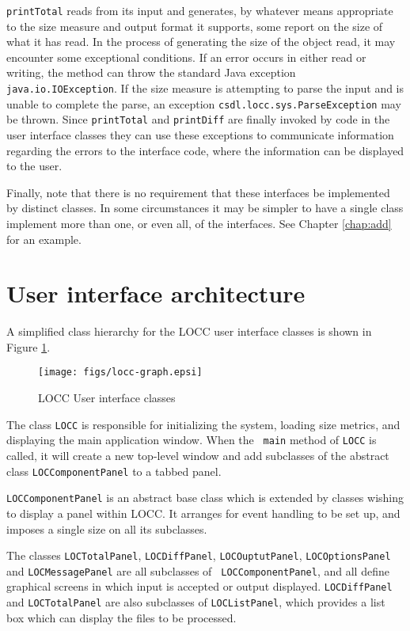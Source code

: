 \mbox{\tt printTotal} reads from its input and generates, by whatever means 
appropriate to the size measure and output format it supports, some
report on the size of what it has read.  In the process of generating
the size of the object read, it may encounter some exceptional
conditions.  If an error occurs in either read or writing, the method
can throw the standard Java exception \mbox{\tt java.io.IOException}.  If the
size measure is attempting to parse the input and is unable to
complete the parse, an exception \mbox{\tt csdl.locc.sys.ParseException} may be
thrown.  Since \mbox{\tt printTotal} and \mbox{\tt printDiff} are finally invoked by code in 
the user interface classes they can use these exceptions to
communicate information regarding the errors to the interface code,
where the information can be displayed to the user.  


Finally, note that there is no requirement that these interfaces be
implemented by distinct classes.  In some circumstances it may be
simpler to have a single class implement more than one, or even all,
of the interfaces.  See Chapter \ref{chap:add} for an example.


\section{User interface architecture}

A simplified class hierarchy for the LOCC user interface classes is shown
in Figure \ref{fig:user-graph}.

\begin{figure}
\centering
\texttt{[image: figs/locc-graph.epsi]}
\caption{LOCC User interface classes}
\label{fig:user-graph}
\end{figure}

The class {\tt LOCC} is responsible for initializing the system, loading
size metrics, and displaying the main application window.  When the {\tt
  main} method of {\tt LOCC} is called, it will create a new top-level
window and add subclasses of the abstract class {\tt LOCComponentPanel} to
a tabbed panel.  

{\tt LOCComponentPanel} is an abstract base class which is extended by
classes wishing to display a panel within LOCC.  It arranges for event
handling to be set up, and imposes a single size on all its subclasses.

The classes {\tt LOCTotalPanel}, {\tt LOCDiffPanel}, {\tt LOCOuptutPanel},
{\tt LOCOptionsPanel} and {\tt LOCMessagePanel} are all subclasses of {\tt
  LOCComponentPanel}, and all define graphical screens in which input is
accepted  or output displayed.  {\tt LOCDiffPanel} and {\tt LOCTotalPanel}
are also subclasses of {\tt LOCListPanel}, which provides a list box which
can display the files to be processed.

